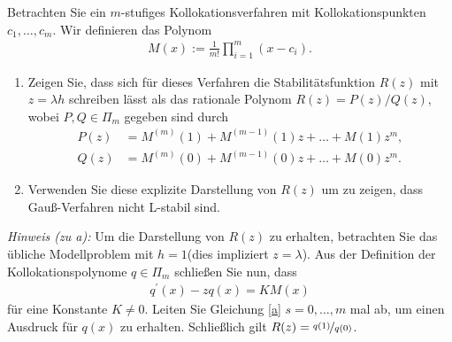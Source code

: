 \begin{exercise}
Betrachten Sie ein $m$-stufiges Kollokationsverfahren mit Kollokationspunkten
$c_1,\dots,c_m$. Wir definieren das Polynom
\begin{align*}
  M(x) := \frac{1}{m!}\prod_{i = 1}^m (x - c_i).
\end{align*}
\begin{enumerate}[label = \textbf{\alph*)}]
  \item Zeigen Sie, dass sich für dieses Verfahren die Stabilitätsfunktion $R(z)$
  mit $z = \lambda h$ schreiben lässt als das rationale Polynom $R(z) = P(z)/Q(z)$,
  wobei $P,Q \in \Pi_m$ gegeben sind durch
  \begin{align*}
    P(z) &= M^{(m)}(1) + M^{(m-1)}(1)z + \dots + M(1)z^m, \\
    Q(z) &= M^{(m)}(0) + M^{(m-1)}(0)z + \dots + M(0)z^m.
  \end{align*}
  \item Verwenden Sie diese explizite Darstellung von $R(z)$ um zu zeigen, dass
  Gauß-Verfahren nicht L-stabil sind.
\end{enumerate}
\textit{Hinweis (zu a):} Um die Darstellung von $R(z)$ zu erhalten, betrachten Sie
das übliche Modellproblem mit $h = 1$(dies impliziert $z = \lambda$). Aus der
Definition der Kollokationspolynome $q \in \Pi_m$ schließen Sie nun, dass
\begin{align*}\label{a}
  q^{\prime}(x) - zq(x) = KM(x)
\end{align*}
für eine Konstante $K \neq 0$. Leiten Sie Gleichung \eqref{a} $s=0,\dots,m$
mal ab, um einen Ausdruck für $q(x)$ zu erhalten. Schließlich gilt
$R(z) = \nicefrac{q(1)}{q(0)}$.
\end{exercise}
